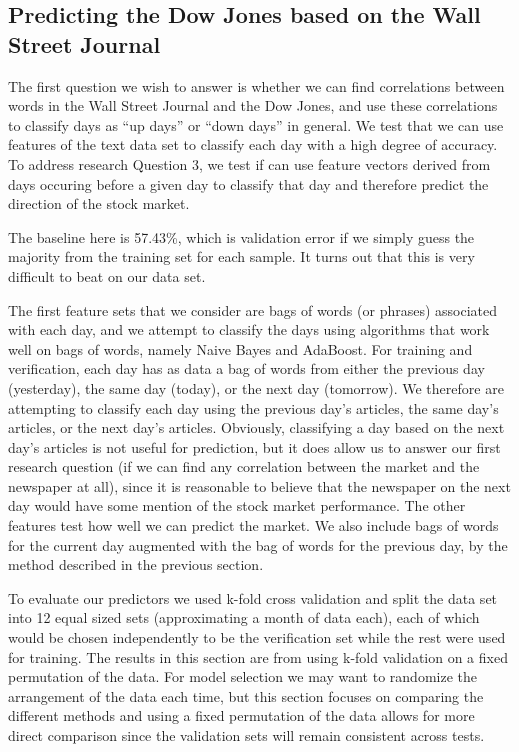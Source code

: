 \documentclass[10pt, twocolumn]{article}
\begin{document}
\subsection{Predicting the Dow Jones based on the Wall Street Journal}
\label{wsj->dj}

The first question we wish to answer is whether we can find correlations between words in the Wall Street Journal and the Dow Jones, and use these correlations to classify days as ``up days'' or ``down days'' in general. We test that we can use features of the text data set to classify each day with a high degree of accuracy. To address research Question 3, we test if can use feature vectors derived from days occuring before a given day to classify that day and therefore predict the direction of the stock market.

The baseline here is 57.43\%, which is validation error if we simply guess the majority from the training set for each sample. It turns out that this is very difficult to beat on our data set.

The first feature sets that we consider are bags of words (or phrases) associated with each day, and we attempt to classify the days using algorithms that work well on bags of words, namely Naive Bayes and AdaBoost. For training and verification, each day has as data a bag of words from either the previous day (yesterday), the same day (today), or the next day (tomorrow). We therefore are attempting to classify each day using the previous day's articles, the same day's articles, or the next day's articles. Obviously, classifying a day based on the next day's articles is not useful for prediction, but it does allow us to answer our first research question (if we can find any correlation between the market and the newspaper at all), since it is reasonable to believe that the newspaper on the next day would have some mention of the stock market performance. The other features test how well we can predict the market. We also include bags of words for the current day augmented with the bag of words for the previous day, by the method described in the previous section.

To evaluate our predictors we used k-fold cross validation and split the data set into 12 equal sized sets (approximating a month of data each), each of which would be chosen independently to be the verification set while the rest were used for training. The results in this section are from using k-fold validation on a fixed permutation of the data. For model selection we may want to randomize the arrangement of the data each time, but this section focuses on comparing the different methods and using a fixed permutation of the data allows for more direct comparison since the validation sets will remain consistent across tests.
\end{document}
